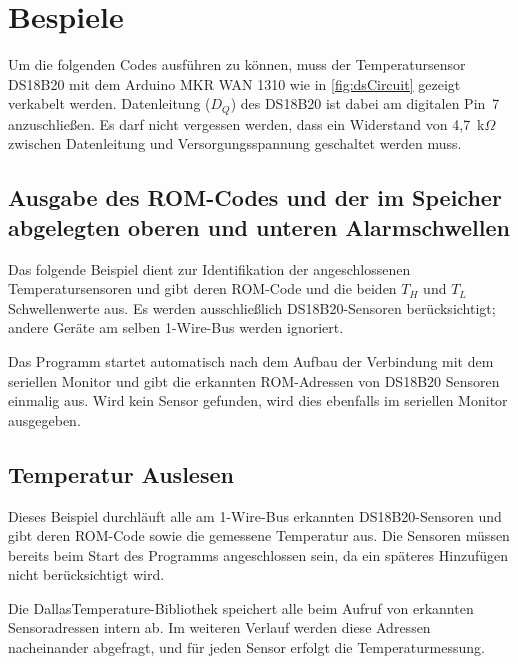 
\section{Bespiele}
	Um die folgenden Codes ausführen zu können, muss der Temperatursensor DS18B20 mit dem Arduino MKR WAN 1310 wie in \autoref{fig:dsCircuit} gezeigt verkabelt werden. Datenleitung ($D_Q$) des DS18B20 ist dabei am digitalen Pin~7 anzuschlie{\ss}en. Es darf nicht vergessen werden, dass ein Widerstand von 4{,}7~k$\Omega$ zwischen Datenleitung und Versorgungsspannung geschaltet werden muss.
	
\subsection{Ausgabe des ROM-Codes und der im Speicher abgelegten oberen und unteren Alarmschwellen}
	Das folgende Beispiel dient zur Identifikation der angeschlossenen Temperatursensoren und gibt deren ROM-Code und die beiden $T_H$ und $T_L$ Schwellenwerte aus. Es werden ausschlie{\ss}lich DS18B20-Sensoren berücksichtigt; andere Geräte am selben 1-Wire-Bus werden ignoriert. 
	
	Das Programm startet automatisch nach dem Aufbau der Verbindung mit dem seriellen Monitor und gibt die erkannten ROM-Adressen von DS18B20 Sensoren einmalig aus. Wird kein Sensor gefunden, wird dies ebenfalls im seriellen Monitor ausgegeben.
	
	
	{
		
	}
	
\subsection{Temperatur Auslesen}
	Dieses Beispiel durchläuft alle am 1-Wire-Bus erkannten DS18B20-Sensoren und gibt deren ROM-Code sowie die gemessene Temperatur aus. Die Sensoren müssen bereits beim Start des Programms angeschlossen sein, da ein späteres Hinzufügen nicht berücksichtigt wird. 
	
	Die DallasTemperature-Bibliothek speichert alle beim Aufruf von  erkannten Sensoradressen intern ab. Im weiteren Verlauf werden diese Adressen nacheinander abgefragt, und für jeden Sensor erfolgt die Temperaturmessung. 
	
